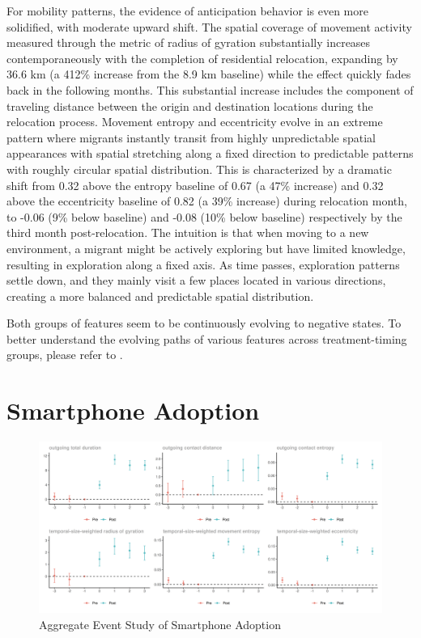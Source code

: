 For mobility patterns, the evidence of anticipation behavior is even more solidified, with moderate upward shift.
The spatial coverage of movement activity measured through the metric of radius of gyration substantially increases contemporaneously with the completion of residential relocation, expanding by 36.6 km (a 412\% increase from the 8.9 km baseline) while the effect quickly fades back in the following months. This substantial increase includes the component of traveling distance between the origin and destination locations during the relocation process.
Movement entropy and eccentricity evolve in an extreme pattern where migrants instantly transit from highly unpredictable spatial appearances with spatial stretching along a fixed direction to predictable patterns with roughly circular spatial distribution.
This is characterized by a dramatic shift from 0.32 above the entropy baseline of 0.67 (a 47\% increase) and 0.32 above the eccentricity baseline of 0.82 (a 39\% increase) during relocation month, to -0.06 (9\% below baseline) and -0.08 (10\% below baseline) respectively by the third month post-relocation. The intuition is that when moving to a new environment, a migrant might be actively exploring but have limited knowledge, resulting in exploration along a fixed axis. As time passes, exploration patterns settle down, and they mainly visit a few places located in various directions, creating a more balanced and predictable spatial distribution.

Both groups of features seem to be continuously evolving to negative states. To better understand the evolving paths of various features across treatment-timing groups, please refer to .

\clearpage\newpage
\section{Smartphone Adoption}
\begin{figure}[h!]
\centering
\caption{Aggregate Event Study of Smartphone Adoption}
\vspace{0.1cm}

\includegraphics[scale=0.49]{figures/csdid/smartphone_adoption.png}

\label{fig:event_study_smartphone_adoption}
\end{figure}

